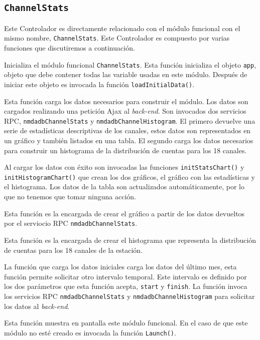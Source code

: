 	\subsection{\texttt{ChannelStats}}
		Este Controlador es directamente relacionado con el módulo funcional con el mismo nombre, \texttt{ChannelStats}. Este Controlador es
		compuesto por varias funciones que discutiremos a continuación.
		\begin{description}[style=unboxed,leftmargin=0cm]
			\item[\texttt{Launch()}]
				Inicializa el módulo funcional \texttt{ChannelStats}. Esta función inicializa el objeto \texttt{app}, objeto que debe
				contener todas las variable usadas en este módulo. Después de iniciar este objeto es invocada la función
				\texttt{loadInitialData()}.
			\item[\texttt{loadInitialData()}]
				Esta función carga los datos necesarios para construir el módulo. Los datos son cargados realizando una petición Ajax
				al \emph{back-end}. Son invocados dos servicios RPC, \texttt{nmdadbChannelStats} y \texttt{nmdadbChannelHistogram}. El
				primero devuelve una serie de estadísticas descriptivas de los canales, estos datos son representados en un gráfico y
				también listados en una tabla. El segundo carga los datos necesarios para construir un histograma de la distribución
				de cuentas para los 18 canales.
				\par
				Al cargar los datos con éxito son invocadas las funciones \texttt{initStatsChart()} y \texttt{initHistogramChart()}
				que  crean los dos gráficos, el gráfico con las estadísticas y el histograma. Los datos de la tabla son actualizados
				automáticamente, por lo que no tenemos que tomar ninguna acción.
			\item[\texttt{initStatsChart()}]
				Esta función es la encargada de crear el gráfico a partir de los datos devueltos por el serviocio RPC
				\texttt{nmdadbChannelStats}. 
			\item[\texttt{initChannelHistogram()}]
				Esta función es la encargada de crear el histograma que representa la distribución de cuentas para los 18 canales de
				la estación.
			\item[\texttt{searchInterval()}]
				La función que carga los datos iniciales carga los datos del último mes, esta función permite solicitar otro intervalo
				temporal. Este intervalo es definido por los dos parámetros que esta función acepta, \texttt{start} y \texttt{finish}.
				La función invoca los servicios RPC \texttt{nmdadbChannelStats} y \texttt{nmdadbChannelHistogram} para solicitar los
				datos al \emph{back-end}.
			\item[\texttt{showModule()}]
				Esta función muestra en pantalla este módulo funcional. En el caso de que este módulo no esté creado es invocada la
				función \texttt{Launch()}.
		\end{description}
